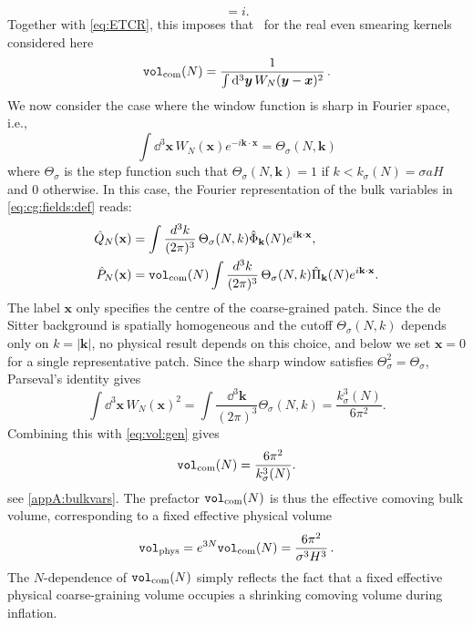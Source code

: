 \documentclass{article}
\newcommand{\VF}{\mathtt{vol}_{\rm com}}
\newcommand{\Vphys}{\mathtt{vol}_{\rm phys}}
\numberwithin{equation}{section}
\begin{document}
    \begin{equation}
        [\hat Q_N,\hat P_N]=i.
    \end{equation}
    Together with \cref{eq:ETCR}, this imposes that~\cite{Martin:2021xml} for the real even smearing kernels considered here
	\begin{equation}
		\label{eq:vol:gen}
		\VF(N) = \frac{1}{\int\dd^3\bm{y}\, W_N(\bm{y}-\bm{x})^{2}} \, .
	\end{equation}
	We now consider the case where the window function is sharp in Fourier space, i.e.,
	\begin{equation} \label{eq:heaviside}
		\int\dd^3\bm{x}\, W_N(\bm{x}) e^{-i \bm{k}\cdot\bm{x}}=\Theta_\sigma(N,\bm{k})
	\end{equation}
	where $\Theta_\sigma$ is the step function such that $\Theta_\sigma(N,\bm{k})=1$ if $k<k_\sigma(N)=\sigma a H$ and $0$ otherwise.
	In this case, the Fourier representation of the bulk variables in \cref{eq:cg:fields:def} reads:
	\begin{align}\label{eq:PQ-def-sharp}
		\hat Q_N(\mathbf x) &= \int\frac{d^3k}{(2\pi)^3}\,\Theta_\sigma(N,k)\hat\Phi_{\mathbf k}(N)e^{i\mathbf k\cdot\mathbf x}, \\
		\hat P_N(\mathbf x) &= \VF(N) \int\frac{d^3k}{(2\pi)^3}\,\Theta_\sigma(N,k)\hat\Pi_{\mathbf k}(N)e^{i\mathbf k\cdot\mathbf x}.
	\end{align}
	The label \(\bm{x}\) only specifies the centre of the coarse-grained patch. Since the de Sitter background is spatially homogeneous and the cutoff \(\Theta_\sigma(N,k)\) depends only on \(k=|\bm{k}|\), no physical result depends on this choice, and below we set \(\bm{x}=0\) for a single representative patch. Since the sharp window satisfies \(\Theta_\sigma^2=\Theta_\sigma\), Parseval's identity gives
    \begin{equation}
    \int \dd^3\bm{x}\,W_N(\bm{x})^2=\int\frac{\dd^3\bm{k}}{(2\pi)^3}\Theta_\sigma(N,k)=\frac{k_\sigma^3(N)}{6\pi^2}.
    \end{equation}
Combining this with \cref{eq:vol:gen} gives
\begin{equation}\label{eq:VF-integral}
\VF(N)=\frac{6\pi^2}{k_\sigma^3(N)} .
\end{equation}
    see \cref{appA:bulkvars}. The prefactor $\VF(N)$ is thus the effective comoving bulk volume, corresponding to a fixed effective physical volume
	\begin{equation}\label{eq:VphysF-sharp}
		\Vphys = e^{3N}\VF(N) = \frac{6\pi^2}{\sigma^3H^3}\, .
	\end{equation}
	The \(N\)-dependence of \(\VF(N)\) simply reflects the fact that a fixed effective physical coarse-graining volume occupies a shrinking comoving volume during inflation.
\end{document}
